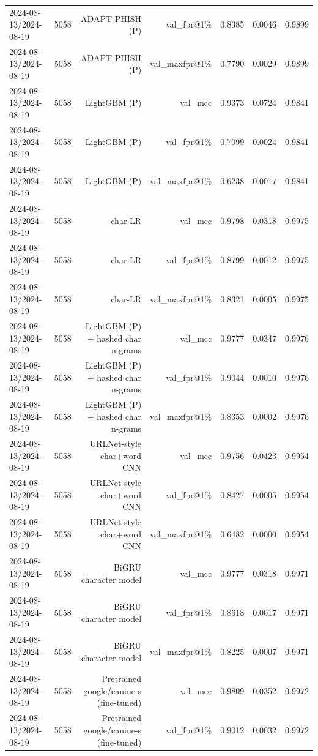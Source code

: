 \begin{table}[t]
\begin{tabular}{llrrrrr}
2024-08-13/2024-08-19 & 5058 & ADAPT-PHISH (P) & val\_fpr@1\% & 0.8385 & 0.0046 & 0.9899 \\
2024-08-13/2024-08-19 & 5058 & ADAPT-PHISH (P) & val\_maxfpr@1\% & 0.7790 & 0.0029 & 0.9899 \\
2024-08-13/2024-08-19 & 5058 & LightGBM (P) & val\_mcc & 0.9373 & 0.0724 & 0.9841 \\
2024-08-13/2024-08-19 & 5058 & LightGBM (P) & val\_fpr@1\% & 0.7099 & 0.0024 & 0.9841 \\
2024-08-13/2024-08-19 & 5058 & LightGBM (P) & val\_maxfpr@1\% & 0.6238 & 0.0017 & 0.9841 \\
2024-08-13/2024-08-19 & 5058 & char-LR & val\_mcc & 0.9798 & 0.0318 & 0.9975 \\
2024-08-13/2024-08-19 & 5058 & char-LR & val\_fpr@1\% & 0.8799 & 0.0012 & 0.9975 \\
2024-08-13/2024-08-19 & 5058 & char-LR & val\_maxfpr@1\% & 0.8321 & 0.0005 & 0.9975 \\
2024-08-13/2024-08-19 & 5058 & LightGBM (P) + hashed char n-grams & val\_mcc & 0.9777 & 0.0347 & 0.9976 \\
2024-08-13/2024-08-19 & 5058 & LightGBM (P) + hashed char n-grams & val\_fpr@1\% & 0.9044 & 0.0010 & 0.9976 \\
2024-08-13/2024-08-19 & 5058 & LightGBM (P) + hashed char n-grams & val\_maxfpr@1\% & 0.8353 & 0.0002 & 0.9976 \\
2024-08-13/2024-08-19 & 5058 & URLNet-style char+word CNN & val\_mcc & 0.9756 & 0.0423 & 0.9954 \\
2024-08-13/2024-08-19 & 5058 & URLNet-style char+word CNN & val\_fpr@1\% & 0.8427 & 0.0005 & 0.9954 \\
2024-08-13/2024-08-19 & 5058 & URLNet-style char+word CNN & val\_maxfpr@1\% & 0.6482 & 0.0000 & 0.9954 \\
2024-08-13/2024-08-19 & 5058 & BiGRU character model & val\_mcc & 0.9777 & 0.0318 & 0.9971 \\
2024-08-13/2024-08-19 & 5058 & BiGRU character model & val\_fpr@1\% & 0.8618 & 0.0017 & 0.9971 \\
2024-08-13/2024-08-19 & 5058 & BiGRU character model & val\_maxfpr@1\% & 0.8225 & 0.0007 & 0.9971 \\
2024-08-13/2024-08-19 & 5058 & Pretrained google/canine-s (fine-tuned) & val\_mcc & 0.9809 & 0.0352 & 0.9972 \\
2024-08-13/2024-08-19 & 5058 & Pretrained google/canine-s (fine-tuned) & val\_fpr@1\% & 0.9012 & 0.0032 & 0.9972 \\

\end{tabular}
\end{table}
